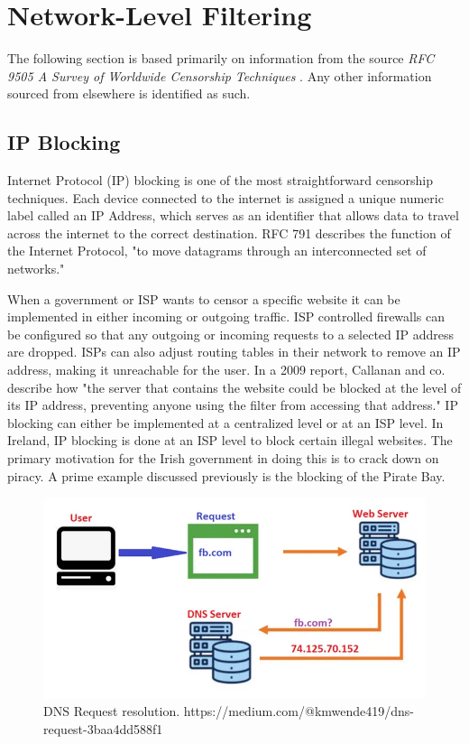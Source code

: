 \section{Network-Level Filtering}
The following section is based primarily on information from the source \textit{RFC 9505 A Survey of Worldwide Censorship Techniques} \cite{rfc9505}. Any other information sourced from elsewhere is identified as such.

\subsection{IP Blocking}
Internet Protocol (IP) blocking is one of the most straightforward censorship techniques. Each device connected to the internet is assigned a unique numeric label called an IP Address, which serves as an identifier that allows data to travel across the internet to the correct destination. RFC 791 describes the function of the Internet Protocol, "to move datagrams through an interconnected set of networks." \cite{rfc791}

When a government or ISP wants to censor a specific website it can be implemented in either incoming or outgoing traffic. ISP controlled firewalls can be configured so that any outgoing or incoming requests to a selected IP address are dropped. ISPs can also adjust routing tables in their network to remove an IP address, making it unreachable for the user. In a 2009 report, Callanan and co. describe how "the server that contains the website could be blocked at the level of its IP address, preventing anyone using the filter from accessing that address." \cite{inthemis2025internet} IP blocking can either be implemented at a centralized level or at an ISP level. In Ireland, IP blocking is done at an ISP level to block certain illegal websites. The primary motivation for the Irish government in doing this is to crack down on piracy. A prime example discussed previously is the blocking of the Pirate Bay. \cite{piratebay_block2013}

\begin{figure} [H]
    \centering
    \includegraphics[width=1\linewidth]{DNSimg.png}
    \caption{DNS Request resolution. https://medium.com/@kmwende419/dns-request-3baa4dd588f1}
    \label{fig:enter-label}
\end{figure}


